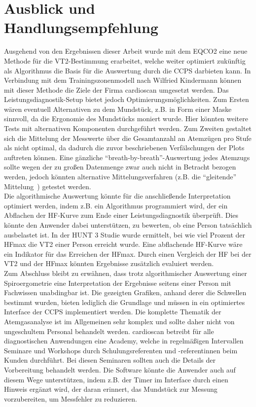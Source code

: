 \section{Ausblick und Handlungsempfehlung}
%
Ausgehend von den Ergebnissen dieser Arbeit wurde mit dem \gls{EQCO2} eine neue Methode für die VT2-Bestimmung erarbeitet, welche weiter optimiert zukünftig als Algorithmus die Basis für die Auswertung durch die \gls{CCPS} darbieten kann. In Verbindung mit dem Trainingszonenmodell nach Wilfried Kindermann können mit dieser Methode die Ziele der Firma cardioscan umgesetzt werden. Das Leistungsdiagnostik-Setup bietet jedoch Optimierungsmöglichkeiten. Zum Ersten wären eventuell Alternativen zu dem Mundstück, z.B. in Form einer Maske sinnvoll, da die Ergonomie des Mundstücks moniert wurde. Hier könnten weitere Tests mit alternativen Komponenten durchgeführt werden. Zum Zweiten gestaltet sich die Mittelung der Messwerte über die Gesamtanzahl an Atemzügen pro Stufe als nicht optimal, da dadurch die zuvor beschriebenen Verfälschungen der Plots auftreten können. Eine gänzliche "`breath-by-breath"'-Auswertung jedes Atemzugs sollte wegen der zu großen Datenmenge zwar auch nicht in Betracht bezogen werden, jedoch könnten alternative Mittelungsverfahren (z.B. die "`gleitende"' Mittelung~\cite{Kroidl.2015}) getestet werden.\\
Die algorithmische Auswertung könnte für die anschließende Interpretation optimiert werden, indem z.B. ein Algorithmus programmiert wird, der ein Abflachen der \gls{HF}-Kurve zum Ende einer Leistungsdiagnostik überprüft. Dies könnte den Anwender dabei unterstützen, zu bewerten, ob eine Person tatsächlich ausbelastet ist. In der HUNT 3 Studie wurde ermittelt, bei wie viel Prozent der \gls{HFmax} die VT2 einer Person erreicht wurde. Eine abflachende \gls{HF}-Kurve wäre ein Indikator für das Erreichen der \gls{HFmax}. Durch einen Vergleich der \gls{HF} bei der VT2 und der \gls{HFmax} könnten Ergebnisse zusätzlich evaluiert werden.\\
Zum Abschluss bleibt zu erwähnen, dass trotz algorithmischer Auswertung einer Spiroergometrie eine Interpretation der Ergebnisse seitens einer Person mit Fachwissen unabdingbar ist. Die gezeigten Grafiken, anhand derer die Schwellen bestimmt wurden, bieten lediglich die Grundlage und müssen in ein optimiertes Interface der \gls{CCPS} implementiert werden. Die komplette Thematik der Atemgasanalyse ist im Allgemeinen sehr komplex und sollte daher nicht von ungeschultem Personal behandelt werden. cardioscan betreibt für alle diagnostischen Anwendungen eine Academy, welche in regelmäßigen Intervallen Seminare und Workshops durch Schulungsreferenten und -referentinnen beim Kunden durchführt. Bei diesen Seminaren sollten auch die Details der Vorbereitung behandelt werden. Die Software könnte die Anwender auch auf diesem Wege unterstützen, indem z.B. der Timer im Interface durch einen Hinweis ergänzt wird, der daran erinnert, das Mundstück zur Messung vorzubereiten, um Messfehler zu reduzieren.
%
\nocite{*}


%
\printbibliography

